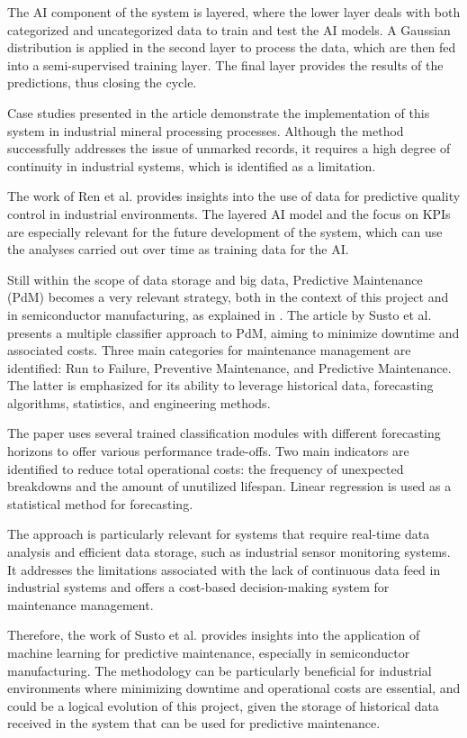 The \gls{AI} component of the system is layered, where the lower layer deals with both categorized and uncategorized data to train and test the AI models. A Gaussian distribution is applied in the second layer to process the data, which are then fed into a semi-supervised training layer. The final layer provides the results of the predictions, thus closing the cycle.

Case studies presented in the article demonstrate the implementation of this system in industrial mineral processing processes. Although the method successfully addresses the issue of unmarked records, it requires a high degree of continuity in industrial systems, which is identified as a limitation.

The work of Ren et al. provides insights into the use of data for predictive quality control in industrial environments. The layered \gls{AI} model and the focus on KPIs are especially relevant for the future development of the system, which can use the analyses carried out over time as training data for the \gls{AI}.

Still within the scope of data storage and big data, Predictive Maintenance (PdM) becomes a very relevant strategy, both in the context of this project and in semiconductor manufacturing, as explained in \cite{susto2015machine}. The article by Susto et al.\cite{susto2015machine} presents a multiple classifier approach to PdM, aiming to minimize downtime and associated costs. Three main categories for maintenance management are identified: Run to Failure, Preventive Maintenance, and Predictive Maintenance. The latter is emphasized for its ability to leverage historical data, forecasting algorithms, statistics, and engineering methods.

The paper uses several trained classification modules with different forecasting horizons to offer various performance trade-offs. Two main indicators are identified to reduce total operational costs: the frequency of unexpected breakdowns and the amount of unutilized lifespan. Linear regression is used as a statistical method for forecasting.

The approach is particularly relevant for systems that require real-time data analysis and efficient data storage, such as industrial sensor monitoring systems. It addresses the limitations associated with the lack of continuous data feed in industrial systems and offers a cost-based decision-making system for maintenance management.

Therefore, the work of Susto et al. provides insights into the application of machine learning for predictive maintenance, especially in semiconductor manufacturing. The methodology can be particularly beneficial for industrial environments where minimizing downtime and operational costs are essential, and could be a logical evolution of this project, given the storage of historical data received in the system that can be used for predictive maintenance.


